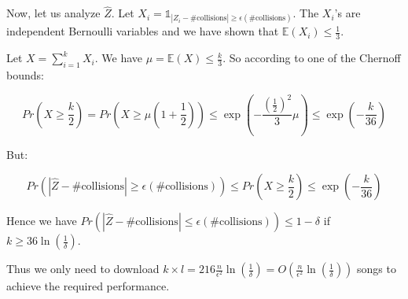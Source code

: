 \documentclass[10pt,a4paper]{article}
\theoremstyle{plain}
\begin{document}
Now, let us analyze $\hat{Z}$. Let $X_i = \mathds{1}_{|Z_i - \text{\# collisions}| \geq \epsilon (\text{\# collisions})}$. The $X_i$'s are independent Bernoulli variables and we have shown that $\mathbb{E}(X_i) \leq \frac{1}{3}$.

Let $X = \sum_{i = 1}^k{X_i}$. We have $\mu = \mathbb{E}(X) \leq \frac{k}{3}$. So according to one of the Chernoff bounds:

$$
Pr(X \geq \frac{k}{2}) = Pr(X \geq \mu(1 + \frac{1}{2})) \leq \exp(-\frac{(\frac{1}{2})^2}{3}\mu) \leq \exp(-\frac{k}{36})
$$

But:

$$
Pr(|\hat{Z} - \text{\# collisions}| \geq \epsilon (\text{\# collisions})) \leq Pr(X \geq \frac{k}{2}) \leq \exp(-\frac{k}{36})
$$

Hence we have $Pr(|\hat{Z} - \text{\# collisions}| \leq \epsilon (\text{\# collisions})) \leq 1 - \delta$ if $k \geq 36\ln(\frac{1}{\delta})$.

Thus we only need to download $k \times l = 216\frac{n}{\epsilon^2}\ln(\frac{1}{\delta}) = O(\frac{n}{\epsilon^2}\ln(\frac{1}{\delta}))$ songs to achieve the required performance.
\end{document}
